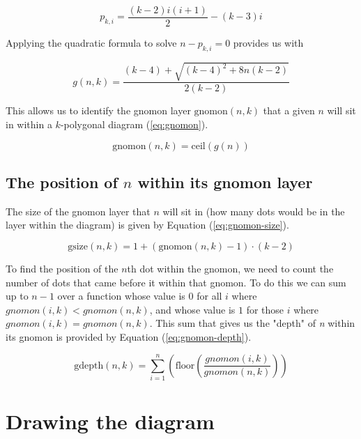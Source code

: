 \documentclass[notitlepage]{report}
\begin{document}
\begin{equation}
    p_{k,i} = \frac{(k-2)i(i+1)}{2} - (k-3)i
    \label{eq:quad}
\end{equation}

Applying the quadratic formula to solve $n-p_{k,i}=0$ provides us with

\begin{equation}
    g\left(n,k\right)=\frac{\left(k-4\right)+\sqrt{\left(k-4\right)^{2}+8n\left(k-2\right)}}{2\left(k-2\right)}
     \label{eq:quadform}
\end{equation}

This allows us to identify the gnomon layer $\text{gnomon}(n,k)$ that a given $n$ will sit in within a $k$-polygonal diagram (\ref{eq:gnomon}).

\begin{equation}
    \text{gnomon}\left(n,k\right) = \text{ceil}\left(g\left(n\right)\right)  
    \label{eq:gnomon}
\end{equation}

\subsection*{The position of $n$ within its gnomon layer}

The size of the gnomon layer that $n$ will sit in (how many dots would be in the layer within the diagram) is given by Equation (\ref{eq:gnomon-size}).

\begin{equation}
\text{gsize}\left(n,k\right)= 1+(\text{gnomon}\left(n,k\right)-1)\cdot\left(k-2\right)
\label{eq:gnomon-size}
\end{equation}

To find the position of the $n$th dot within the gnomon, we need to count the number of dots that came before it within that gnomon. To do this we can sum up to $n-1$ over a function whose value is $0$ for all $i$ where $gnomon(i,k)<gnomon(n,k)$, and whose value is $1$ for those $i$ where $gnomon(i,k)=gnomon(n,k)$. This sum that gives us the "depth" of \textit{n} within its gnomon is provided by Equation (\ref{eq:gnomon-depth}).

\begin{equation}
    \text{gdepth}\left(n,k\right)=\sum_{i=1}^{n}\left(\text{floor}\left(\frac{gnomon\left(i,k\right)}{gnomon\left(n,k\right)}\right)\right)
    \label{eq:gnomon-depth}
\end{equation}

\section*{Drawing the diagram}
\end{document}
